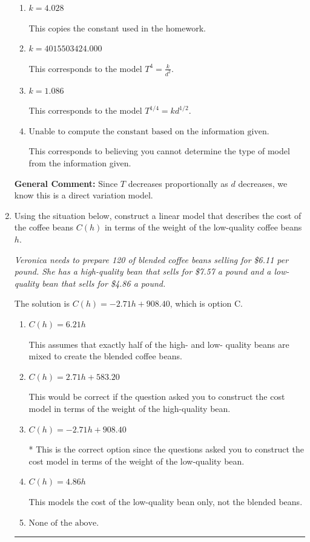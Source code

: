 \documentclass{extbook}[14pt]
\newcommand{\litem}[1]{\item #1

\rule{\textwidth}{0.4pt}}
\begin{document}
\begin{enumerate}
{\begin{enumerate}[label=\Alph*.]
* This is the correct option corresponding to the model $T^{4} = k d^{2}$.
\item \( k = 4.028 \)

This copies the constant used in the homework.
\item \( k = 4015503424.000 \)

This corresponds to the model $T^{4} = \frac{k}{d^{2}}$.
\item \( k = 1.086 \)

This corresponds to the model $T^{1/4} = k d^{1/2}$.
\item \( \text{Unable to compute the constant based on the information given.} \)

This corresponds to believing you cannot determine the type of model from the information given.
\end{enumerate}

\textbf{General Comment:} Since $T$ decreases proportionally as $d$ decreases, we know this is a direct variation model.
}
\litem{
Using the situation below, construct a linear model that describes the cost of the coffee beans $C(h)$ in terms of the weight of the low-quality coffee beans $h$.

\begin{center}
    \textit{ Veronica needs to prepare 120 of blended coffee beans selling for \$6.11 per pound. She has a high-quality bean that sells for \$7.57 a pound and a low-quality bean that sells for \$4.86 a pound. }
\end{center}
The solution is \( C(h) = -2.71 h + 908.40 \), which is option C.\begin{enumerate}[label=\Alph*.]
\item \( C(h) = 6.21 h \)

This assumes that exactly half of the high- and low- quality beans are mixed to create the blended coffee beans.
\item \( C(h) = 2.71 h + 583.20 \)

This would be correct if the question asked you to construct the cost model in terms of the weight of the high-quality bean.
\item \( C(h) = -2.71 h + 908.40 \)

* This is the correct option since the questions asked you to construct the cost model in terms of the weight of the low-quality bean.
\item \( C(h) = 4.86 h \)

This models the cost of the low-quality bean only, not the blended beans.
\item \( \text{None of the above.} \)


\end{enumerate}}
\end{enumerate}
\end{document}
